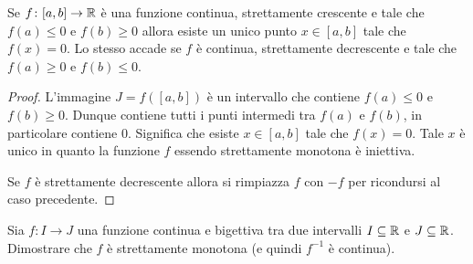 \begin{corollary}
  \label{th:zeri_monotona}%
  Se $f\colon [a,b]\to \mathbb R$ è una funzione
  continua,
  strettamente crescente e tale che $f(a)\le 0$
  e $f(b)\ge 0$ allora esiste un unico punto $x\in [a,b]$
  tale che $f(x) = 0$.
  Lo stesso accade se $f$ è continua, strettamente
  decrescente e tale che $f(a)\ge 0$ e $f(b)\le 0$.
\end{corollary}
%
\begin{proof}
L'immagine $J=f([a,b])$ è un intervallo che contiene
$f(a)\le 0$ e $f(b)\ge 0$.
Dunque contiene tutti i punti intermedi tra $f(a)$
e $f(b)$, in particolare contiene $0$.
Significa che esiste $x\in [a,b]$ tale che $f(x)=0$.
Tale $x$ è unico in quanto la funzione $f$ essendo
strettamente monotona è iniettiva.

Se $f$ è strettamente decrescente allora si rimpiazza
$f$ con $-f$ per ricondursi al caso precedente.
\end{proof}

\begin{exercise}\label{ex:inversa_monotona}
Sia $f\colon I\to J$ una funzione continua
e bigettiva tra due
intervalli $I\subseteq \mathbb R$ e $J\subseteq \mathbb R$.
Dimostrare che $f$ è strettamente
monotona (e quindi $f^{-1}$ è continua).
\end{exercise}

